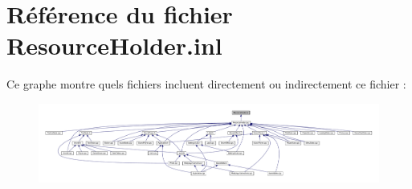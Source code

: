 \hypertarget{_resource_holder_8inl}{}\section{Référence du fichier Resource\+Holder.\+inl}
\label{_resource_holder_8inl}
Ce graphe montre quels fichiers incluent directement ou indirectement ce fichier \+:
\nopagebreak
\begin{figure}[H]
\begin{center}
\leavevmode
\includegraphics[width=350pt]{_resource_holder_8inl__dep__incl}
\end{center}
\end{figure}
